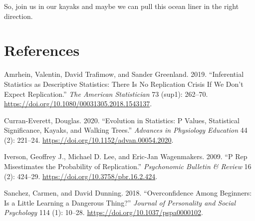 \documentclass[
]{article}
\begin{document}
So, join us in our kayaks and maybe we can pull this ocean liner in the
right direction.

\hypertarget{references}{%
\section*{References}\label{references}}

\hypertarget{refs}{}
\leavevmode\hypertarget{ref-Amrhein_Trafimow_Greenland_2019}{}%
Amrhein, Valentin, David Trafimow, and Sander Greenland. 2019.
``Inferential Statistics as Descriptive Statistics: There Is No
Replication Crisis If We Don't Expect Replication.'' \emph{The American
Statistician} 73 (sup1): 262--70.
\url{https://doi.org/10.1080/00031305.2018.1543137}.

\leavevmode\hypertarget{ref-Curran_2020}{}%
Curran-Everett, Douglas. 2020. ``Evolution in Statistics: P Values,
Statistical Significance, Kayaks, and Walking Trees.'' \emph{Advances in
Physiology Education} 44 (2): 221--24.
\url{https://doi.org/10.1152/advan.00054.2020}.

\leavevmode\hypertarget{ref-Iverson_Lee_Wagenmakers_2009}{}%
Iverson, Geoffrey J., Michael D. Lee, and Eric-Jan Wagenmakers. 2009.
``P Rep Misestimates the Probability of Replication.'' \emph{Psychonomic
Bulletin \& Review} 16 (2): 424--29.
\url{https://doi.org/10.3758/pbr.16.2.424}.

\leavevmode\hypertarget{ref-Sanchez_Dunning_2018}{}%
Sanchez, Carmen, and David Dunning. 2018. ``Overconfidence Among
Beginners: Is a Little Learning a Dangerous Thing?'' \emph{Journal of
Personality and Social Psychology} 114 (1): 10--28.
\url{https://doi.org/10.1037/pspa0000102}.
\end{document}
